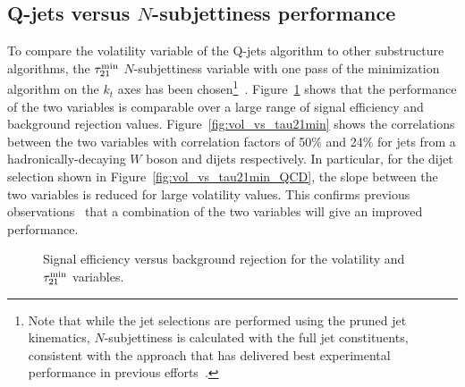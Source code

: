 
\subsection{Q-jets versus $N$-subjettiness performance}
\label{app:qjets:jetvol:nsubj}

To compare the volatility variable of the Q-jets algorithm to other substructure algorithms, the $\tau^{\rm min}_{21}$ $N$-subjettiness variable with one pass of the minimization algorithm on the $k_t$ axes has been chosen\footnote{Note that while the jet selections are performed using the pruned jet kinematics, $N$-subjettiness is calculated with the full jet constituents, consistent with the approach that has delivered best experimental performance in previous efforts~\cite{ATLAS:2012am}.}~\cite{Thaler:2010tr,Thaler:2011gf,ATLAS:2012am}. Figure~\ref{fig:VvsNsubGraph} shows that the performance of the two variables is comparable over a large range of signal efficiency and background rejection values. Figure~\ref{fig:vol_vs_tau21min} shows the correlations between the two variables with correlation factors of 50\% and 24\% for jets from a hadronically-decaying $W$ boson and dijets respectively. In particular, for the dijet selection shown in Figure~\ref{fig:vol_vs_tau21min_QCD}, the slope between the two variables is reduced for large volatility values. This confirms previous observations~\cite{MattHadroWorkshop} that a combination of the two variables will give an improved performance. 

\begin{figure}[htbp]
\centering
{}
\caption{Signal efficiency versus background rejection for the volatility and $\tau^{\rm min}_{21}$ variables.}
\label{fig:VvsNsubGraph}
\end{figure}

